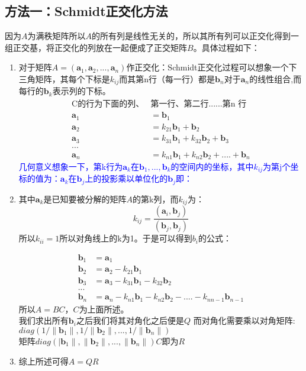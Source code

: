 \documentclass[12pt]{article}
\begin{document}
\begin{CJK*}{UTF8}{gbsn}
\subsection{方法一：Schmidt正交化方法}
因为$A$为满秩矩阵所以$A$的所有列是线性无关的，所以其所有列可以正交化得到一组正交基，将正交化的列放在一起便成了正交矩阵$B$。具体过程如下：
\begin{enumerate}
	\item 对于矩阵$A=(\bm a_1,\bm a_2,...,\bm a_n)$作正交化：Schmidt正交化过程可以想象一个下三角矩阵，其每个下标是$k_{ij}$而其第n行（每一行）都是$\bm b_n$对于$\bm a_n$的线性组合,而每行的$\bm b_k$表示列的下标。
	\begin{align*}
			\mbox{C的行为下面的列、}&\mbox{第一行、}\mbox{第二行...}\mbox{...第n
		行}\\
		\bm a_1&=\bm b_1\\
		\bm a_2&=k_{21}\bm b_1+\bm b_2\\
		\bm a_3&=k_{31}\bm b_1+k_{32}\bm b_2+\bm b_3\\
		...\\
		\bm a_n&=k_{n1}\bm b_1+k_{n2}\bm b_2+....+\bm b_n
	\end{align*}
	\textcolor{blue}{几何意义想象一下，第k行为$\bm a_k$在$\bm b_1,...,\bm b_k$的空间内的坐标，其中$k_{ij}$为第j个坐标的值为：$\bm a_k$在$\bm b_j$上的投影乘以单位化的$\bm b_{j}$即：}
	\item 其中$\bm a_k$是已知要被分解的矩阵$A$的第k列，而$k_{ij}$为：
	\begin{equation}
		k_{ij}=\frac{(\bm a_i,\bm b_j)}{(\bm b_j,\bm b_j)}
	\end{equation}
	所以$k_{ii}=1$所以对角线上的k为1。于是可以得到$b_i$的公式：

		\begin{align*}
		\bm b_1&=\bm a_1\\
		\bm b_2&=\bm a_2-k_{21}\bm b_1\\
		\bm b_3&=\bm a_3-k_{31}\bm b_1-k_{32}\bm b_2\\
		...\\ 
		\bm b_n&=\bm a_n-k_{n1}\bm b_1-k_{n2}\bm b_2-....-k_{nn-1}\bm b_{n-1}
	\end{align*}
	所以$A=BC$，$C$为上面所述。\\
	我们求出所有$\bm b_i$之后我们将其对角化之后便是$Q$
	而对角化需要乘以对角矩阵:\\
	$diag(1/\|\bm b_1\|,1/\|\bm b_2\|,...,1/\|\bm b_n\|)$\\
	矩阵$diag(|\bm b_1\|,\|\bm b_2\|,...,\|\bm b_n\|)C$即为$R$
	\item 综上所述可得$A=QR$
\end{enumerate}

\end{CJK*}
\end{document}
